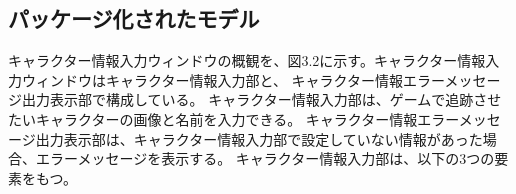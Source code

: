 \subsection{パッケージ化されたモデル}\label{sec:sub2}
キャラクター情報入力ウィンドウの概観を、図3.2に示す。キャラクター情報入力ウィンドウはキャラクター情報入力部と、
キャラクター情報エラーメッセージ出力表示部で構成している。
キャラクター情報入力部は、ゲームで追跡させたいキャラクターの画像と名前を入力できる。
キャラクター情報エラーメッセージ出力表示部は、キャラクター情報入力部で設定していない情報があった場合、エラーメッセージを表示する。
キャラクター情報入力部は、以下の3つの要素をもつ。







